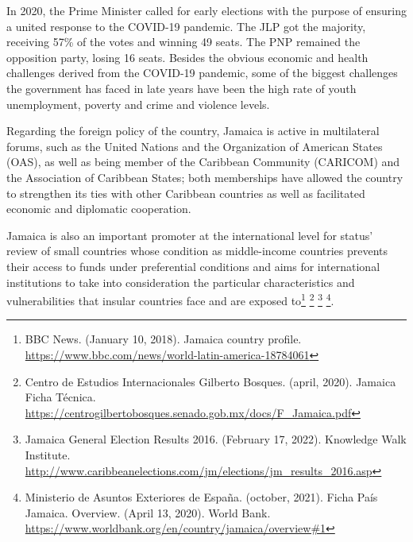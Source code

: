 \documentclass[
  10pt,
]{book}
\begin{document}
In 2020, the Prime Minister called for early elections with the purpose of ensuring a united response to the COVID-19 pandemic. The JLP got the majority, receiving 57\% of the votes and winning 49 seats. The PNP remained the opposition party, losing 16 seats. Besides the obvious economic and health challenges derived from the COVID-19 pandemic, some of the biggest challenges the government has faced in late years have been the high rate of youth unemployment, poverty and crime and violence levels.

Regarding the foreign policy of the country, Jamaica is active in multilateral forums, such as the United Nations and the Organization of American States (OAS), as well as being member of the Caribbean Community (CARICOM) and the Association of Caribbean States; both memberships have allowed the country to strengthen its ties with other Caribbean countries as well as facilitated economic and diplomatic cooperation.

Jamaica is also an important promoter at the international level for status' review of small countries whose condition as middle-income countries prevents their access to funds under preferential conditions and aims for international institutions to take into consideration the particular characteristics and vulnerabilities that insular countries face and are exposed to\footnote{BBC News. (January 10, 2018). Jamaica country profile. \url{https://www.bbc.com/news/world-latin-america-18784061}} \footnote{Centro de Estudios Internacionales Gilberto Bosques. (april, 2020). Jamaica Ficha Técnica. \url{https://centrogilbertobosques.senado.gob.mx/docs/F_Jamaica.pdf}} \footnote{Jamaica General Election Results 2016. (February 17, 2022). Knowledge Walk Institute. \url{http://www.caribbeanelections.com/jm/elections/jm_results_2016.asp}} \footnote{Ministerio de Asuntos Exteriores de España. (october, 2021). Ficha País Jamaica. Overview. (April 13, 2020). World Bank. \url{https://www.worldbank.org/en/country/jamaica/overview\#1}}.
\end{document}
